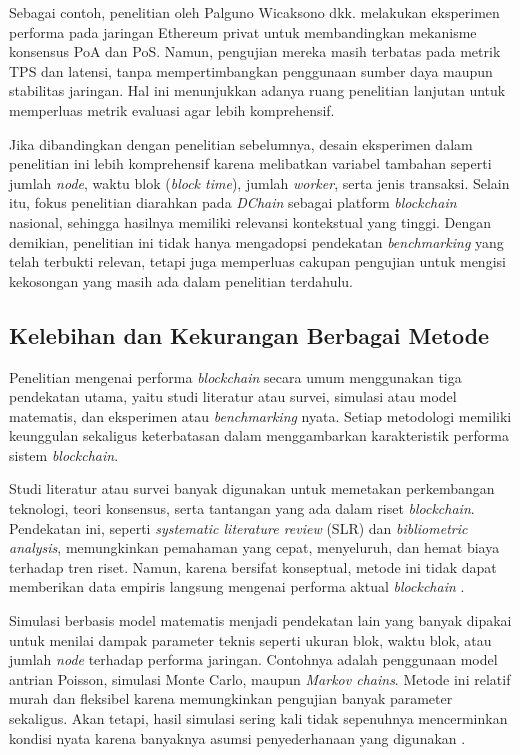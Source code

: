 Sebagai contoh, penelitian oleh Palguno Wicaksono dkk. \cite{wicaksono2021} melakukan eksperimen performa pada jaringan Ethereum privat untuk membandingkan mekanisme konsensus PoA dan PoS. Namun, pengujian mereka masih terbatas pada metrik TPS dan latensi, tanpa mempertimbangkan penggunaan sumber daya maupun stabilitas jaringan. Hal ini menunjukkan adanya ruang penelitian lanjutan untuk memperluas metrik evaluasi agar lebih komprehensif.

Jika dibandingkan dengan penelitian sebelumnya, desain eksperimen dalam penelitian ini lebih komprehensif karena melibatkan variabel tambahan seperti jumlah \textit{node}, waktu blok (\textit{block time}), jumlah \textit{worker}, serta jenis transaksi. Selain itu, fokus penelitian diarahkan pada \textit{DChain} sebagai platform \textit{blockchain} nasional, sehingga hasilnya memiliki relevansi kontekstual yang tinggi. Dengan demikian, penelitian ini tidak hanya mengadopsi pendekatan \textit{benchmarking} yang telah terbukti relevan, tetapi juga memperluas cakupan pengujian untuk mengisi kekosongan yang masih ada dalam penelitian terdahulu.


\subsection{Kelebihan dan Kekurangan Berbagai Metode}

Penelitian mengenai performa \textit{blockchain} secara umum menggunakan tiga pendekatan utama, yaitu studi literatur atau survei, simulasi atau model matematis, dan eksperimen atau \textit{benchmarking} nyata. Setiap metodologi memiliki keunggulan sekaligus keterbatasan dalam menggambarkan karakteristik performa sistem \textit{blockchain}.

Studi literatur atau survei banyak digunakan untuk memetakan perkembangan teknologi, teori konsensus, serta tantangan yang ada dalam riset \textit{blockchain}. Pendekatan ini, seperti \textit{systematic literature review} (SLR) dan \textit{bibliometric analysis}, memungkinkan pemahaman yang cepat, menyeluruh, dan hemat biaya terhadap tren riset. Namun, karena bersifat konseptual, metode ini tidak dapat memberikan data empiris langsung mengenai performa aktual \textit{blockchain} \cite{fan2020, rico2023, bellucci2022, zheng2019}.

Simulasi berbasis model matematis menjadi pendekatan lain yang banyak dipakai untuk menilai dampak parameter teknis seperti ukuran blok, waktu blok, atau jumlah \textit{node} terhadap performa jaringan. Contohnya adalah penggunaan model antrian Poisson, simulasi Monte Carlo, maupun \textit{Markov chains}. Metode ini relatif murah dan fleksibel karena memungkinkan pengujian banyak parameter sekaligus. Akan tetapi, hasil simulasi sering kali tidak sepenuhnya mencerminkan kondisi nyata karena banyaknya asumsi penyederhanaan yang digunakan \cite{fan2020, bellucci2022, cao2021}.

